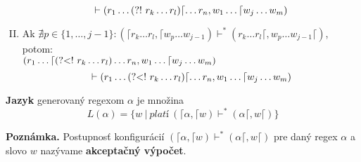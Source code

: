 \begin{df}
\begin{enumerate}[I.]
$$\vdash (r_1\dots \text{(?!~} r_{k}\dots r_{l} ) \lceil\dots r_n, w_1\dots \lceil w_j \dots w_m)$$
\item Ak $\nexists p \in \lbrace 1,\dots,j-1\rbrace: (\lceil r_k\dots r_l,\lceil w_p\dots w_{j-1}) \vdash^* (r_k\dots r_l\lceil, w_p \dots w_{j-1} \lceil)$, potom:
\\$\displaystyle{(r_1\dots\lceil \text{(?\textless !~}r_{k}\dots r_{l} ) \dots r_n, w_1\dots \lceil w_j \dots w_m)}$
$$\vdash (r_1\dots \text{(?\textless !~} r_{k}\dots r_{l} ) \lceil\dots r_n, w_1\dots \lceil w_j \dots w_m)$$
\end{enumerate}

\end{df}

\begin{df}
\textbf{Jazyk} generovaný regexom $\alpha$ je množina $$L(\alpha) = \lbrace w~|~platí ~ (\lceil \alpha, \lceil w)\vdash^* (\alpha\lceil, w\lceil) \rbrace$$
\end{df}

\textbf{Poznámka.}
Postupnosť konfigurácií $(\lceil \alpha, \lceil w)\vdash^* (\alpha\lceil, w\lceil)$ pre daný regex $\alpha$ a slovo $w$ nazývame \textbf{akceptačný výpočet}.

